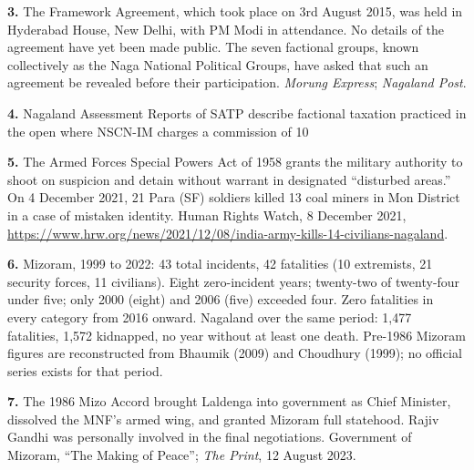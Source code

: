 \documentclass[12pt,a4paper]{article}
\begin{document}
\vspace{0.4em}

\noindent\textbf{3.} The Framework Agreement, which took place on 3rd August 2015, was held in Hyderabad House, New Delhi, with PM Modi in attendance. No details of the agreement have yet been made public. The seven factional groups, known collectively as the Naga National Political Groups, have asked that such an agreement be revealed before their participation. \textit{Morung Express}; \textit{Nagaland Post}.

\vspace{0.4em}

\noindent\textbf{4.} Nagaland Assessment Reports of SATP describe factional taxation practiced in the open where NSCN-IM charges a commission of 10%

\vspace{0.4em}

\noindent\textbf{5.} The Armed Forces Special Powers Act of 1958 grants the military authority to shoot on suspicion and detain without warrant in designated ``disturbed areas.'' On 4 December 2021, 21 Para (SF) soldiers killed 13 coal miners in Mon District in a case of mistaken identity. Human Rights Watch, 8 December 2021, \url{https://www.hrw.org/news/2021/12/08/india-army-kills-14-civilians-nagaland}.

\vspace{0.4em}

\noindent\textbf{6.} Mizoram, 1999 to 2022: 43 total incidents, 42 fatalities (10 extremists, 21 security forces, 11 civilians). Eight zero-incident years; twenty-two of twenty-four under five; only 2000 (eight) and 2006 (five) exceeded four. Zero fatalities in every category from 2016 onward. Nagaland over the same period: 1,477 fatalities, 1,572 kidnapped, no year without at least one death. Pre-1986 Mizoram figures are reconstructed from Bhaumik (2009) and Choudhury (1999); no official series exists for that period.

\vspace{0.4em}

\noindent\textbf{7.} The 1986 Mizo Accord brought Laldenga into government as Chief Minister, dissolved the MNF's armed wing, and granted Mizoram full statehood. Rajiv Gandhi was personally involved in the final negotiations. Government of Mizoram, ``The Making of Peace''; \textit{The Print}, 12 August 2023.
\end{document}
